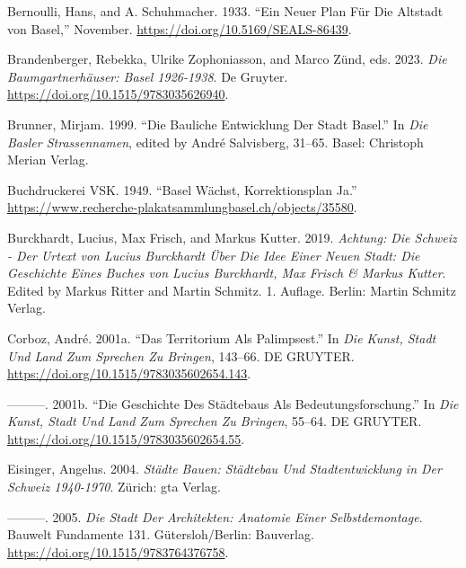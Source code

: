 \documentclass[
  letterpaper,
  DIV=11,
  numbers=noendperiod]{scrartcl}
\newlength{\cslhangindent}
\newenvironment{CSLReferences}[2] %
 {\begin{list}{}{%
  \setlength{\itemindent}{0pt}
  \setlength{\leftmargin}{0pt}
  \setlength{\parsep}{0pt}
  \ifodd #1
   \setlength{\leftmargin}{\cslhangindent}
   \setlength{\itemindent}{-1\cslhangindent}
  \fi
  \setlength{\itemsep}{#2\baselineskip}}}
 {\end{list}}
\begin{document}
\label{refs}
\begin{CSLReferences}{1}{0}
Bernoulli, Hans, and A. Schuhmacher. 1933. {``Ein Neuer {Plan} Für Die
{Altstadt} von {Basel},''} November.
\url{https://doi.org/10.5169/SEALS-86439}.

Brandenberger, Rebekka, Ulrike Zophoniasson, and Marco Zünd, eds. 2023.
\emph{Die {Baumgartnerhäuser}: {Basel} 1926-1938}. De Gruyter.
\url{https://doi.org/10.1515/9783035626940}.

Brunner, Mirjam. 1999. {``Die Bauliche {Entwicklung} Der {Stadt}
{Basel}.''} In \emph{Die {Basler} {Strassennamen}}, edited by André
Salvisberg, 31--65. Basel: Christoph Merian Verlag.

Buchdruckerei VSK. 1949. {``Basel Wächst, {Korrektionsplan} {Ja}.''}
\url{https://www.recherche-plakatsammlungbasel.ch/objects/35580}.

Burckhardt, Lucius, Max Frisch, and Markus Kutter. 2019. \emph{Achtung:
Die {Schweiz} - {Der} {Urtext} von {Lucius} {Burckhardt} Über Die {Idee}
Einer Neuen {Stadt}: {Die} {Geschichte} Eines {Buches} von {Lucius}
{Burckhardt}, {Max} {Frisch} \& {Markus} {Kutter}}. Edited by Markus
Ritter and Martin Schmitz. 1. Auflage. Berlin: Martin Schmitz Verlag.

Corboz, André. 2001a. {``Das {Territorium} Als {Palimpsest}.''} In
\emph{Die {Kunst}, {Stadt} Und {Land} Zum {Sprechen} Zu Bringen},
143--66. DE GRUYTER. \url{https://doi.org/10.1515/9783035602654.143}.

---------. 2001b. {``Die {Geschichte} Des {Städtebaus} Als
{Bedeutungsforschung}.''} In \emph{Die {Kunst}, {Stadt} Und {Land} Zum
{Sprechen} Zu Bringen}, 55--64. DE GRUYTER.
\url{https://doi.org/10.1515/9783035602654.55}.

Eisinger, Angelus. 2004. \emph{Städte Bauen: {Städtebau} Und
{Stadtentwicklung} in Der {Schweiz} 1940-1970}. Zürich: gta Verlag.

---------. 2005. \emph{Die {Stadt} Der {Architekten}: {Anatomie} Einer
{Selbstdemontage}}. Bauwelt {Fundamente} 131. Gütersloh/Berlin:
Bauverlag. \url{https://doi.org/10.1515/9783764376758}.


\end{CSLReferences}
\end{document}
